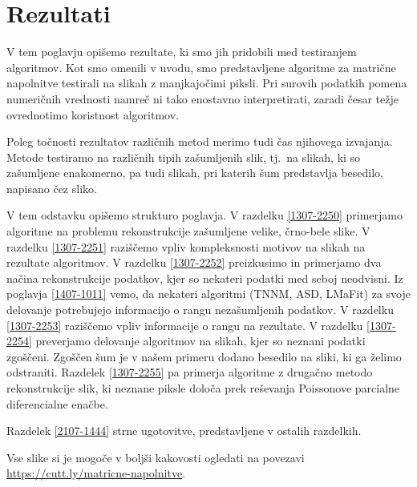\chapter{Rezultati}\label{1407-1012}

V tem poglavju opišemo rezultate, ki smo jih pridobili med testiranjem algoritmov. Kot smo omenili v uvodu, smo predstavljene algoritme za matrične napolnitve testirali na slikah z manjkajočimi piksli. 
Pri surovih podatkih pomena numeričnih vrednosti namreč ni tako enostavno interpretirati, zaradi česar težje ovrednotimo koristnost algoritmov.

Poleg točnosti rezultatov različnih metod merimo tudi čas njihovega izvajanja. Metode testiramo na različnih tipih zašumljenih slik, tj.\ na slikah, ki so zašumljene enakomerno, pa tudi slikah, pri katerih šum predstavlja besedilo, napisano čez sliko.

V tem odstavku opišemo strukturo poglavja.
V razdelku \ref{1307-2250} primerjamo algoritme na problemu rekonstrukcije zašumljene velike, črno-bele slike. V razdelku \ref{1307-2251} raziščemo vpliv kompleksnosti motivov na slikah na rezultate algoritmov. V razdelku \ref{1307-2252} preizkusimo in primerjamo dva načina rekonstrukcije podatkov, kjer so nekateri podatki med seboj neodvisni. Iz poglavja \ref{1407-1011} vemo, da nekateri algoritmi (TNNM, ASD, LMaFit) za svoje delovanje potrebujejo informacijo o rangu nezašumljenih podatkov. V razdelku \ref{1307-2253} raziščemo vpliv informacije o rangu na rezultate. V razdelku \ref{1307-2254} preverjamo delovanje algoritmov na slikah, kjer so neznani podatki zgoščeni.
Zgoščen šum je v našem primeru dodano besedilo na sliki, ki ga želimo odstraniti. Razdelek \ref{1307-2255} pa primerja algoritme z drugačno metodo rekonstrukcije slik, ki neznane piksle določa prek reševanja Poissonove parcialne diferencialne enačbe. 

Razdelek \ref{2107-1444} strne ugotovitve, predstavljene v ostalih razdelkih.


Vse slike si je mogoče v boljši kakovosti ogledati na povezavi \url{https://cutt.ly/matricne-napolnitve}. 

